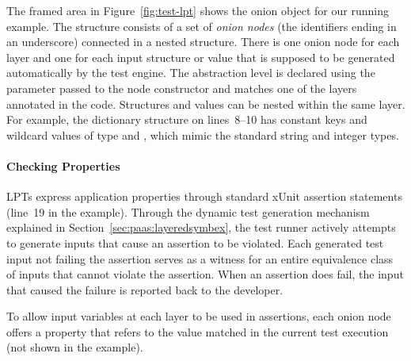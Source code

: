 The framed area in Figure~\ref{fig:test-lpt} shows the onion object for our running example.  The structure consists of a set of \emph{onion nodes} (the identifiers ending in an underscore) connected in a nested structure.  There is one onion node for each layer and one for each input structure or value that is supposed to be generated automatically by the test engine.  The abstraction level is declared using the  parameter passed to the node constructor and matches one of the layers annotated in the code.  Structures and values can be nested within the same layer.  For example, the dictionary structure on lines~8--10 has constant keys and wildcard values of type  and , which mimic the standard string and integer types.

\paragraph{Checking Properties}

LPTs express application properties through standard xUnit assertion statements (line~19 in the example).  Through the dynamic test generation mechanism explained in Section~\ref{sec:paas:layeredsymbex}, the test runner actively attempts to generate inputs that cause an assertion to be violated. Each generated test input not failing the assertion serves as a witness for an entire equivalence class of inputs that cannot violate the assertion.
%
When an assertion does fail, the input that caused the failure is reported back to the developer.

To allow input variables at each layer to be used in assertions, each onion node offers a  property that refers to the value matched in the current test execution (not shown in the example).

